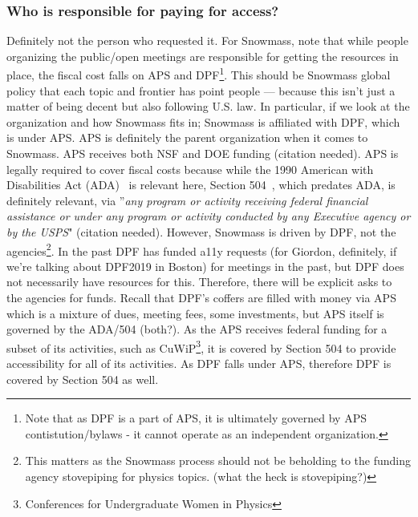 \documentclass{article}
\begin{document}
  \subsubsection{Who is responsible for paying for access?}

  Definitely not the person who requested it. For Snowmass, note that while people organizing the public/open meetings are responsible for getting the resources in place, the fiscal cost falls on APS and DPF\footnote{Note that as DPF is a part of APS, it is ultimately governed by APS contistution/bylaws - it cannot operate as an independent organization.}. This should be Snowmass global policy that each topic and frontier has point people — because this isn’t just a matter of being decent but also following U.S. law. In particular, if we look at the organization and how Snowmass fits in; Snowmass is affiliated with DPF, which is under APS. APS is definitely the parent organization when it comes to Snowmass. APS receives both NSF and DOE funding (citation needed). APS is legally required to cover fiscal costs because while the 1990 American with Disabilities Act (ADA)~\cite{ADA1991} is relevant here, Section 504~\cite{504}, which predates ADA, is definitely relevant, via ''\textsl{any program or activity receiving federal financial assistance or under any program or activity conducted by any Executive agency or by the USPS}" (citation needed). However, Snowmass is driven by DPF, not the agencies\footnote{This matters as the Snowmass process should not be beholding to the funding agency stovepiping for physics topics. (what the heck is stovepiping?)}. In the past DPF has funded a11y requests (for Giordon, definitely, if we're talking about DPF2019 in Boston) for meetings in the past, but DPF does not necessarily have resources for this. Therefore, there will be explicit asks to the agencies for funds. Recall that DPF's coffers are filled with money via APS which is a mixture of dues, meeting fees, some investments, but APS itself is governed by the ADA/504 (both?). As the APS receives federal funding for a subset of its activities, such as CuWiP\footnote{Conferences for Undergraduate Women in Physics}, it is covered by Section 504 to provide accessibility for all of its activities. As DPF falls under APS, therefore DPF is covered by Section 504 as well.
\end{document}

